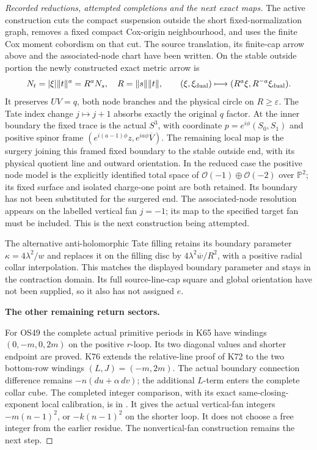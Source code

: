 \begin{proof}[Recorded reductions, attempted completions and the next exact maps]
The active construction cuts the compact suspension outside
the short fixed-normalization graph, removes a fixed compact
Cox-origin neighbourhood, and uses the finite Cox moment
cobordism on that cut. The source translation, its finite-cap
arrow above and the associated-node chart have been written.
On the stable outside portion the newly constructed exact
metric arrow is
\[
 N_t=|\xi|\|t\|^a=R^aN_s,\quad R=\|s\|\|t\|,\qquad
 (\xi,\xi_{\rm dual})\longmapsto
 (R^a\xi,R^{-a}\xi_{\rm dual}).
\]
It preserves \(UV=q\), both node branches and the physical
circle on \(R\ge\varepsilon\). The Tate index change
\(j\mapsto j+1\) absorbs exactly the original \(q\)
factor. At the inner boundary the fixed trace is the actual
\(S^3\), with coordinate \(p=e^{i\phi}(S_0,S_1)\) and
positive spinor frame
\((e^{i(a-1)\phi}z,e^{ia\phi}\overline V)\).
The remaining local map is the surgery joining this framed
fixed boundary to the stable outside end, with its physical
quotient line and outward orientation. In the reduced case
the positive node model is the explicitly identified total
space of \(\mathcal O(-1)\oplus\mathcal O(-2)\) over
\(\mathbb P^2\); its fixed surface and isolated
charge-one point are both retained. Its boundary has not
been substituted for the surgered end. The associated-node resolution appears
on the labelled vertical fan \(j=-1\); its map to the
specified target fan must be included. This is the next
construction being attempted.

The alternative anti-holomorphic Tate filling retains its
boundary parameter \(\kappa=4\lambda^2/w\) and replaces
it on the filling disc by
\(4\lambda^2\overline w/R^2\), with a positive radial
collar interpolation. This matches the displayed boundary
parameter and stays in the contraction domain. Its full
source-line-cap square and global orientation have not
been supplied, so it also has not assigned \(e\).

\par\medskip\noindent\textbf{The other remaining return sectors.}\par\nopagebreak[4]
For OS49 the complete actual primitive periods in K65 have
windings \((0,-m,0,2m)\) on the positive \(r\)-loop.
Its two diagonal values and shorter endpoint are proved.
K76 extends the relative-line proof of K72 to the two
bottom-row windings \((L,J)=(-m,2m)\).
The actual boundary connection difference remains
\(-n(du+\alpha\,dv)\); the additional \(L\)-term enters
the complete collar cube. The completed integer comparison,
with its exact same-closing-exponent local calibration, is in
.
It gives the actual vertical-fan integers
\(-m(n-1)^2\), or \(-k(n-1)^2\) on the shorter loop.
It does not choose a free integer from the earlier residue.
The nonvertical-fan construction remains the next step.


\end{proof}
